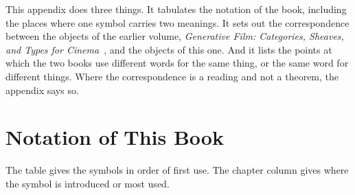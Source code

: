 \documentclass[11pt,twoside,openright]{book}
\theoremstyle{plain}
\theoremstyle{definition}
\theoremstyle{remark}
\begin{document}
This appendix does three things. It tabulates the notation of the book, including the places where one symbol carries two meanings. It sets out the correspondence between the objects of the earlier volume, \emph{Generative Film: Categories, Sheaves, and Types for Cinema}~\cite{flyxion2026gf}, and the objects of this one. And it lists the points at which the two books use different words for the same thing, or the same word for different things. Where the correspondence is a reading and not a theorem, the appendix says so.

\section{Notation of This Book}\label{sec:notation}

The table gives the symbols in order of first use. The chapter column gives where the symbol is introduced or most used.
\end{document}

